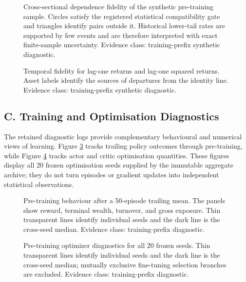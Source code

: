 \begin{figure}[!tbp]
\centering

\caption{Cross-sectional dependence fidelity of the synthetic pre-training
sample. Circles satisfy the registered statistical compatibility gate and
triangles identify pairs outside it. Historical lower-tail rates are supported
by few events and are therefore interpreted with exact finite-sample
uncertainty. Evidence class: training-prefix synthetic diagnostic.}
\label{fig:appendix_synthetic_dependence}
\end{figure}

\begin{figure}[!tbp]
\centering

\caption{Temporal fidelity for lag-one returns and lag-one squared returns.
Asset labels identify the sources of departures from the identity line.
Evidence class: training-prefix synthetic diagnostic.}
\label{fig:appendix_synthetic_temporal}
\end{figure}

\clearpage
\subsection*{C. Training and Optimisation Diagnostics}

The retained diagnostic logs provide complementary behavioural and numerical
views of learning. Figure \ref{fig:appendix_pretraining_stability} tracks
trailing policy outcomes through pre-training, while Figure
\ref{fig:appendix_optimizer} tracks actor and critic optimisation quantities.
These figures display all 20 frozen optimisation seeds supplied by the
immutable aggregate archive; they do not turn episodes or gradient updates
into independent statistical observations.

\begin{figure}[!tbp]
\centering

\caption{Pre-training behaviour after a 50-episode trailing mean. The panels
show reward, terminal wealth, turnover, and gross exposure. Thin transparent
lines identify individual seeds and the dark line is the cross-seed median.
Evidence class: training-prefix diagnostic.}
\label{fig:appendix_pretraining_stability}
\end{figure}

\begin{figure}[!tbp]
\centering

\caption{Pre-training optimizer diagnostics for all 20 frozen seeds. Thin
transparent lines identify individual seeds and the dark line is the
cross-seed median; mutually exclusive fine-tuning selection branches are
excluded. Evidence class: training-prefix diagnostic.}
\label{fig:appendix_optimizer}
\end{figure}

